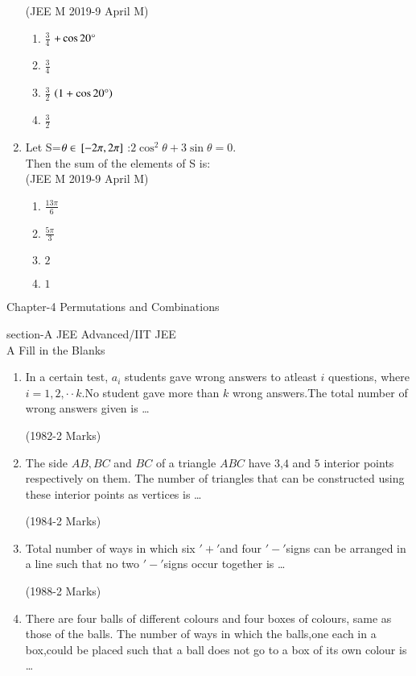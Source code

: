 \documentclass[journal,10pt,twocolumn]{IEEEtran}
\theoremstyle{remark}
\begin{document}
\begin{enumerate}[start=14]
\hfill {(JEE M 2019-9 April M)}\\
\begin{enumerate}
\item $\frac{3}{4}$ $+\cos20\degree$
\item $\frac{3}{4}$\\
 \item $\frac{3}{2}$ $\left(1+\cos20\degree\right)$ 
 \item $\frac{3}{2}$\\
 \end{enumerate}
\item Let S=$\theta \in {}\left[-2\pi, 2\pi\right]$ :$2\cos^2\theta + 3\sin\theta=0.$\\
 Then the sum of the elements of S is:\\
 
\hfill {(JEE M 2019-9 April M)}\\
\begin{enumerate}
\item $\frac{13\pi}{6}$ 
\item $\frac{5\pi}{3}$
 \item $2$
 \item $1$\\
\end{enumerate} 
\end{enumerate}
\begin{center}
Chapter-4 Permutations and Combinations 
\end{center}
section-A JEE Advanced/IIT JEE   
\\
A Fill in the Blanks\\

\begin{enumerate}
\item In a certain test, $a_i$ students gave wrong answers to atleast 
 $i$ questions, where $i=1,2,\cdot\cdot k.$No student gave more than 
 $k$ wrong answers.The total number of wrong answers
 given is \dots
 
\hfill {(1982-2 Marks)} \\

\item The side $AB,BC$ and $BC$ of a triangle $ABC$ have $3$,$4$ and $5$ 
 interior points respectively on them. The number of triangles
 that can be constructed using these interior points as
 vertices is \dots
 
\hfill {(1984-2 Marks)} \\

\item Total number of ways in which six $'+'$and four $'-'$signs can
 be arranged in a line such that no two $'-'$signs occur together
 is \dots
 
\hfill  {(1988-2 Marks)} \\

\item There are four balls of different colours and four boxes of
 colours, same as those of the balls. The number of ways in
 which the balls,one each in a box,could be placed such that
 a ball does not go to a box of its own colour is \dots \\
\\
\end{enumerate} 
\end{document}
